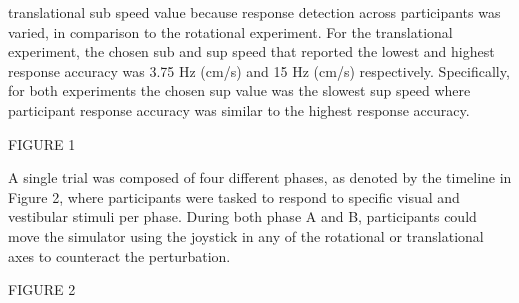 \documentclass[11pt, onecolumn]{article}
\begin{document}
translational sub speed value because response detection across participants was varied, in comparison to the rotational experiment. For the translational experiment, the chosen sub and sup speed that reported the lowest and highest response accuracy was 3.75 Hz (cm/s) and 15 Hz (cm/s) respectively.  Specifically, for both experiments the chosen sup value was the slowest sup speed where participant response accuracy was similar to the highest response accuracy.

FIGURE 1

A single trial was composed of four different phases, as denoted by the timeline in Figure 2, where participants were tasked to respond to specific visual and vestibular stimuli per phase.  During both phase A and B, participants could move the simulator using the joystick in any of the rotational or translational axes to counteract the perturbation.

FIGURE 2
\end{document}
